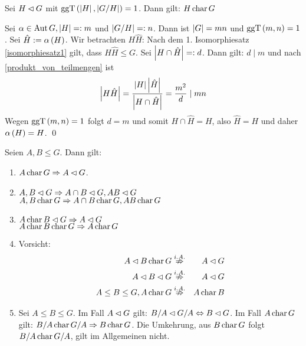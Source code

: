\begin{satz}
 Sei $H \lhd G$ mit $\operatorname{ggT}\left(\left|H\right|, \left|G/H\right|\right)=1$. Dann gilt: $H \operatorname{char} G$
\end{satz}

\begin{beweis}
 Sei $\alpha \in \operatorname{Aut} G, \left| H \right| =: m$ und $\left| G/H \right| =: n$. Dann ist $\left| G \right| = mn$ und $\operatorname{ggT} \left( m, n \right) = 1$. Sei $\hat{H} := \alpha\left(H\right)$. Wir betrachten $H\hat{H}$: Nach dem 1. Isomorphiesatz \ref{isomorphiesatz1} gilt, dass $H\hat{H} \leq G$. Sei $\left|H\cap \hat{H}\right| =: d$. Dann gilt: $d \mid m$ und nach \ref{produkt_von_teilmengen} ist
 \begin{equation*}
  \left|H\hat{H}\right| = \frac{\left|H\right| \left|\hat{H}\right|}{\left|H\cap \hat{H}\right|} = \frac{m^2}{d} \mid mn
 \end{equation*}
 Wegen $\operatorname{ggT}\left(m,n\right)=1$ folgt $d=m$ und somit $H\cap \hat{H}=H$, also $\hat{H}=H$ und daher $\alpha\left(H\right)=H$.
 \qed
\end{beweis}

\begin{satz}
 \label{aussagen_zu_charakteristischen_ugr}
 Seien $A, B \leq G$. Dann gilt:
 \begin{enumerate}
  \item \label{aussagen_zu_charakteristischen_ugr_1} $A \operatorname{char} G \Rightarrow A \lhd G$.
  \item $A, B \lhd G \Rightarrow A \cap B \lhd G, AB \lhd G$\\$A, B \operatorname{char} G \Rightarrow A\cap B \operatorname{char} G, AB \operatorname{char} G$
  \item \label{aussagen_zu_charakteristischen_ugr_3} $A \operatorname{char} B \lhd G \Rightarrow A \lhd G$\\$A \operatorname{char} B \operatorname{char} G \Rightarrow A \operatorname{char} G$
  \item Vorsicht:
   \begin{eqnarray*}
    A \lhd B \operatorname{char} G &\stackrel{i.A.}{\nRightarrow}& A \lhd G\\
    A \lhd B \lhd G &\stackrel{i.A.}{\nRightarrow}& A \lhd G\\
    A \leq B \leq G, A \operatorname{char} G &\stackrel{i.A.}{\nRightarrow}& A \operatorname{char} B
   \end{eqnarray*}
  \item Sei $A \leq B \leq G$. Im Fall $A \lhd G$ gilt: $B/A \lhd G/A \Leftrightarrow B \lhd G$. Im Fall $A \operatorname{char} G$ gilt: $B/A \operatorname{char} G/A \Rightarrow B \operatorname{char} G$. Die Umkehrung, aus $B \operatorname{char} G$ folgt $B/A \operatorname{char} G/A$, gilt im Allgemeinen nicht.
 \end{enumerate}
\end{satz}

